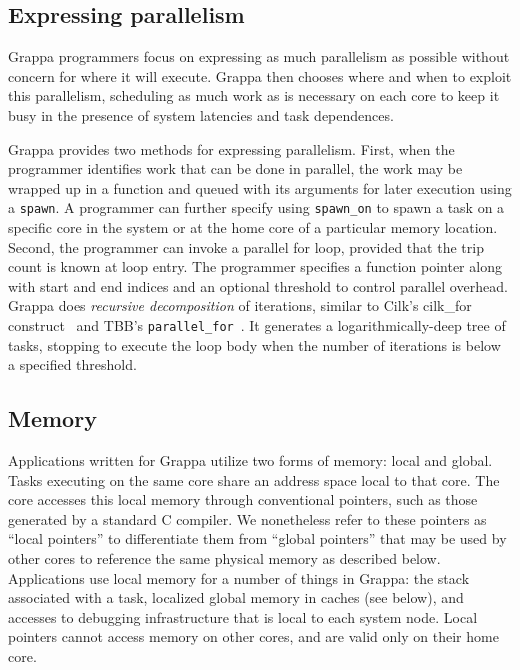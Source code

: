 \subsection{Expressing parallelism}

Grappa programmers focus on expressing as much parallelism as possible without concern for where it will execute. Grappa then chooses where and when to exploit this parallelism, scheduling as much work as is necessary on each core to keep it busy in the presence of system latencies and task dependences.

Grappa provides two methods for expressing parallelism. First, when the programmer identifies work that can be done in parallel, the work may be wrapped up in a function and queued with its arguments for later execution using a \texttt{spawn}. A programmer can further specify using \texttt{spawn\_on} to spawn a task on a specific core in the system or at the home core of a particular memory location. Second, the programmer can invoke a parallel for loop, provided that the trip count is known at loop entry. The programmer specifies a function pointer along with start and end indices and an optional threshold to control parallel overhead. Grappa does {\em recursive decomposition} of iterations, similar to Cilk's cilk\_for construct~\cite {cilkforimplementation} and TBB's {\tt parallel\_for}~\cite{intel_tbb}.  It generates a logarithmically-deep tree of tasks, stopping to execute the loop body when the number of iterations is below a specified threshold.

\subsection{Memory}

Applications written for Grappa utilize two forms of memory: local and global.  Tasks executing on the same core share an address space local to that core.  The core accesses this local memory through conventional pointers, such as those generated by a standard C compiler.  We nonetheless refer to these pointers as ``local pointers'' to differentiate them from ``global pointers'' that may be used by other cores to reference the same physical memory as described below.  Applications use local memory for a number of things in Grappa: the stack associated with a task, localized global memory in caches (see below), and accesses to debugging infrastructure that is local to each system node.  Local pointers cannot access memory on other cores, and are valid only on their home core.


